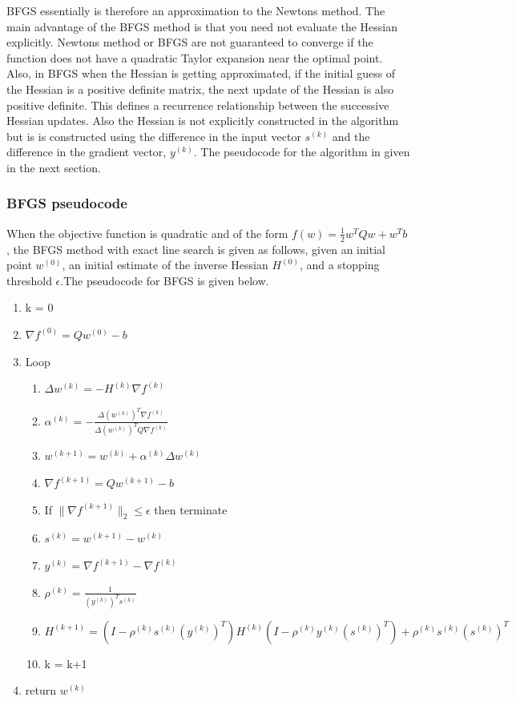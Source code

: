 \documentclass[10pt,twocolumn]{article}
\begin{document}
BFGS essentially is therefore an approximation to the Newtons method. The main advantage of the BFGS method is that you need not evaluate the Hessian explicitly. Newtons method or BFGS are not guaranteed to converge if the function does not have a quadratic Taylor expansion near the optimal point. Also, in BFGS when the Hessian is getting approximated, if the initial guess of the Hessian is a positive definite matrix, the next update of the Hessian is also positive definite. This defines a recurrence relationship between the successive Hessian updates. Also the Hessian is not explicitly constructed in the algorithm but is is constructed using the difference in the input vector $s^{(k)}$ and the difference in the gradient vector, $y^{(k)}$. The pseudocode for the algorithm in given in the next section.


\subsubsection{BFGS pseudocode}
When the objective function is quadratic and of the form $f(w) = \frac{1}{2}w^T Q w + w^T b$, the BFGS method with exact line search is given as follows, given an initial point $w^{(0)}$, an initial estimate of the inverse Hessian $H^{(0)}$, and a stopping threshold $\epsilon$.The pseudocode for BFGS is given below. \\
\begin{enumerate}
\item k = 0
\item $\nabla f^{(0)} = Qw^{(0)} - b$
\item Loop
\begin{enumerate}[label={(\roman*)},leftmargin=2\parindent]
\item $\Delta w^{(k)} = - H^{(k)}\nabla f^{(k)}$
\item $\alpha^{(k)}= -\frac{\Delta (w^{(k)})^T \nabla f^{(k)} }{\Delta (w^{(k)})^T Q \nabla f^{(k)}}$
\item $w^{(k+1)} = w^{(k)} + \alpha^{(k)}\Delta w^{(k)}$
\item $\nabla f^{(k+1)} = Qw^{(k+1)} - b$
\item If $\lVert  \nabla f^{(k+1)} \rVert_{2} \leq \epsilon$ then terminate
\item $s^{(k)} = w^{(k+1)} - w^{(k)}$
\item $y ^{(k)} =  \nabla f^{(k+1)}  -  \nabla f^{(k)} $
\item $\rho^{(k)} = \frac{1}{(y^{(k)})^Ts^{(k)}}$
\item $H^{(k+1)} = (I - \rho^{(k)} s^{(k)}(y^{(k)})^T)H^{(k)} (I - \rho^{(k)} y^{(k)}(s^{(k)})^T) +\rho^{(k)} s^{(k)}(s^{(k)})^T $
\item k = k+1
\end{enumerate}
\item return $w^{(k)}$
\end{enumerate}
\end{document}
